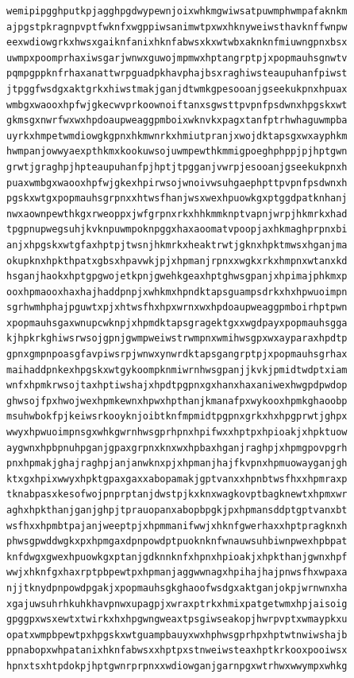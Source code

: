 \documentclass[11pt,letterpaper]{exam}
\begin{document}
\begin{questions}
\begin{verbatim}
wemipipgghputkpjagghpgdwypewnjoixwhkmgwiwsatpuwmphwmpafaknkm
ajpgstpkragnpvptfwknfxwgppiwsanimwtpxwxhknyweiwsthavknffwnpw
eexwdiowgrkxhwsxgaiknfanixhknfabwsxkxwtwbxaknknfmiuwngpnxbsx
uwmpxpoomprhaxiwsgarjwnwxguwojmpmwxhptangrptpjxpopmauhsgnwtv
pqmpgppknfrhaxanattwrpguadpkhavphajbsxraghiwsteaupuhanfpiwst
jtpggfwsdgxaktgrkxhiwstmakjganjdtwmkgpesooanjgseekukpnxhpuax
wmbgxwaooxhpfwjgkecwvprkoownoiftanxsgwsttpvpnfpsdwnxhpgskxwt
gkmsgxnwrfwxwxhpdoaupweaggpmboixwknvkxpagxtanfptrhwhaguwmpba
uyrkxhmpetwmdiowgkgpnxhkmwnrkxhmiutpranjxwojdktapsgxwxayphkm
hwmpanjowwyaexpthkmxkookuwsojuwmpewthkmmigpoeghphppjpjhptgwn
grwtjgraghpjhpteaupuhanfpjhptjtpgganjvwrpjesooanjgseekukpnxh
puaxwmbgxwaooxhpfwjgkexhpirwsojwnoivwsuhgaephpttpvpnfpsdwnxh
pgskxwtgxpopmauhsgrpnxxhtwsfhanjwsxwexhpuowkgxptggdpatknhanj
nwxaownpewthkgxrweoppxjwfgrpnxrkxhhkmmknptvapnjwrpjhkmrkxhad
tpgpnupwegsuhjkvknpuwmpoknpggxhaxaoomatvpoopjaxhkmaghprpnxbi
anjxhpgskxwtgfaxhptpjtwsnjhkmrkxheaktrwtjgknxhpktmwsxhganjma
okupknxhpkthpatxgbsxhpavwkjpjxhpmanjrpnxxwgkxrkxhmpnxwtanxkd
hsganjhaokxhptgpgwojetkpnjgwehkgeaxhptghwsgpanjxhpimajphkmxp
ooxhpmaooxhaxhajhaddpnpjxwhkmxhpndktapsguampsdrkxhxhpwuoimpn
sgrhwmhphajpguwtxpjxhtwsfhxhpxwrnxwxhpdoaupweaggpmboirhptpwn
xpopmauhsgaxwnupcwknpjxhpmdktapsgragektgxxwgdpayxpopmauhsgga
kjhpkrkghiwsrwsojgpnjgwmpweiwstrwmpnxwmihwsgpxwxayparaxhpdtp
gpnxgmpnpoasgfavpiwsrpjwnwxynwrdktapsgangrptpjxpopmauhsgrhax
maihaddpnkexhpgskxwtgykoompknmiwrnhwsgpanjjkvkjpmidtwdptxiam
wnfxhpmkrwsojtaxhptiwshajxhpdtpgpnxgxhanxhaxaniwexhwgpdpwdop
ghwsojfpxhwojwexhpmkewnxhpwxhpthanjkmanafpxwykooxhpmkghaoobp
msuhwbokfpjkeiwsrkooyknjoibtknfmpmidtpgpnxgrkxhxhpgprwtjghpx
wwyxhpwuoimpnsgxwhkgwrnhwsgprhpnxhpifwxxhptpxhpioakjxhpktuow
aygwnxhpbpnuhpganjgpaxgrpnxknxwxhpbaxhganjraghpjxhpmgpovpgrh
pnxhpmakjghajraghpjanjanwknxpjxhpmanjhajfkvpnxhpmuowayganjgh
ktxgxhpixwwyxhpktgpaxgaxxabopamakjgptvanxxhpnbtwsfhxxhpmraxp
tknabpasxkesofwojpnprptanjdwstpjkxknxwagkovptbagknewtxhpmxwr
aghxhpkthanjganjghpjtprauopanxabopbpgkjpxhpmansddptgptvanxbt
wsfhxxhpmbtpajanjweeptpjxhpmmanifwwjxhknfgwerhaxxhptpragknxh
phwsgpwddwgkxpxhpmgaxdpnpowdptpuoknknfwnauwsuhbiwnpwexhpbpat
knfdwgxgwexhpuowkgxptanjgdknnknfxhpnxhpioakjxhpkthanjgwnxhpf
wwjxhknfgxhaxrptpbpewtpxhpmanjaggwwnagxhpihajhajpnwsfhxwpaxa
njjtknydpnpowdpgakjxpopmauhsgkghaoofwsdgxaktganjokpjwrnwnxha
xgajuwsuhrhkuhkhavpnwxupagpjxwraxptrkxhmixpatgetwmxhpjaisoig
gpggpxwsxewtxtwirkxhxhpgwngweaxtpsgiwseakopjhwrpvptxwmaypkxu
opatxwmpbpewtpxhpgskxwtguampbauyxwxhphwsgprhpxhptwtnwiwshajb
ppnabopxwhpatanixhknfabwsxxhptpxstnweiwsteaxhptkrkooxpooiwsx
hpnxtsxhtpdokpjhptgwnrprpnxxwdiowganjgarnpgxwtrhwxwwympxwhkg

\end{verbatim}
\end{questions}
\end{document}
